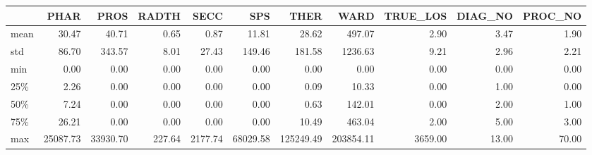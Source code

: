 \begin{tabular}{lrrrrrrrrrr}
\toprule
{} &      PHAR &      PROS &   RADTH &     SECC &       SPS &       THER &       WARD &  TRUE\_LOS &  DIAG\_NO &  PROC\_NO \\
\midrule
mean &     30.47 &     40.71 &    0.65 &     0.87 &     11.81 &      28.62 &     497.07 &      2.90 &     3.47 &     1.90 \\
std  &     86.70 &    343.57 &    8.01 &    27.43 &    149.46 &     181.58 &    1236.63 &      9.21 &     2.96 &     2.21 \\
min  &      0.00 &      0.00 &    0.00 &     0.00 &      0.00 &       0.00 &       0.00 &      0.00 &     0.00 &     0.00 \\
25\%  &      2.26 &      0.00 &    0.00 &     0.00 &      0.00 &       0.09 &      10.33 &      0.00 &     1.00 &     0.00 \\
50\%  &      7.24 &      0.00 &    0.00 &     0.00 &      0.00 &       0.63 &     142.01 &      0.00 &     2.00 &     1.00 \\
75\%  &     26.21 &      0.00 &    0.00 &     0.00 &      0.00 &      10.49 &     463.04 &      2.00 &     5.00 &     3.00 \\
max  &  25087.73 &  33930.70 &  227.64 &  2177.74 &  68029.58 &  125249.49 &  203854.11 &   3659.00 &    13.00 &    70.00 \\
\bottomrule
\end{tabular}
